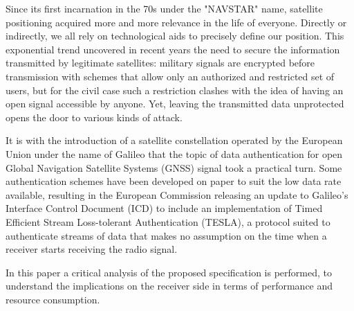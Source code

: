 
Since its first incarnation in the 70s under the "NAVSTAR" name, satellite
positioning acquired more and more relevance in the life of everyone. Directly
or indirectly, we all rely on technological aids to precisely define our
position. This exponential trend uncovered in recent years the need to secure
the information transmitted by legitimate satellites: military signals are
encrypted before transmission with schemes that allow only an authorized and
restricted set of users, but for the civil case such a restriction clashes with
the idea of having an open signal accessible by anyone. Yet, leaving the
transmitted data unprotected opens the door to various kinds of attack.

\vspace{\baselineskip}

It is with the introduction of a satellite constellation operated by the
European Union under the name of Galileo that the topic of data authentication
for open Global Navigation Satellite Systems (GNSS) signal took a practical
turn. Some authentication schemes have been developed on paper to suit the low
data rate available, resulting in the European Commission releasing an update to
Galileo's Interface Control Document (ICD) to include an implementation of
Timed Efficient Stream Loss-tolerant Authentication (TESLA), a protocol suited
to authenticate streams of data that makes no assumption on the time when a
receiver starts receiving the radio signal.

In this paper a critical analysis of the proposed specification is performed, to
understand the implications on the receiver side in terms of performance and
resource consumption.

